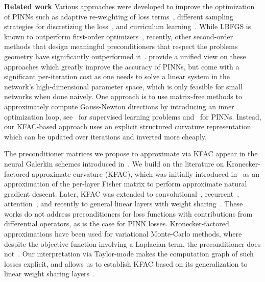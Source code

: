 \textbf{Related work}
Various approaches were developed to improve the optimization of PINNs such as adaptive re-weighting of loss terms~\citep{wang2021understanding,van2022optimally,wang2022and}, different sampling strategies for discretizing the loss~\citep{lu2021deepxde, nabian2021efficient, daw2022rethinking,zapf2022investigating, wang2022respecting, wu2023comprehensive}, and curriculum learning~\citep{krishnapriyan2021characterizing, wang2022respecting}.
While LBFGS is known to outperform first-order optimizers~\citep{markidis2021old},
recently, other second-order methods that design meaningful preconditioners that respect the problems geometry have significantly outperformed it~\cite{zeng2022competitive, muller2023achieving, de2023operator, liu2024preconditioning, jnini2024gauss,chen2024teng, zampini2024petscml}.
\citet{muller2024optimization} provide a unified view on these approaches which greatly improve the accuracy of PINNs, but come with a significant per-iteration cost as one needs to solve a linear system in the network's high-dimensional parameter space, which is only feasible for small networks when done naively.
One approach is to use matrix-free methods to approximately compute Gauss-Newton directions by introducing an inner optimization loop, see~\cite{schraudolph2002fast,martens2010deep} for supervised learning problems and~\cite{zeng2022competitive,bonfanti2024challenges, jnini2024gauss,zampini2024petscml} for PINNs.
Instead, our KFAC-based approach uses an explicit structured curvature representation which can be updated over iterations and inverted more cheaply.

The preconditioner matrices we propose to approximate via KFAC appear in the neural Galerkin schemes introduced in~\citet{bruna2024neural}.
We build on the literature on Kronecker-factored approximate curvature (KFAC), which was initially introduced in~\citet{heskes2000natural,martens2010deep} as an approximation of the per-layer Fisher matrix to perform approximate natural gradient descent.
Later, KFAC was extended to convolutional~\citep{grosse2016kroneckerfactored}, recurrent~\citep{martens2018kroneckerfactored}, attention~\citep{pauloski2021kaisa,osawa2023pipefisher,grosse2023studying}, and recently to general linear layers with weight sharing~\cite{eschenhagen2023kroneckerfactored}.
These works do not address preconditioners for loss functions with contributions from differential operators, as is the case for PINN losses.
Kronecker-factored approximations have been used for variational Monte-Carlo methods, where despite the objective function involving a Laplacian term, the preconditioner does not~\citep{pfau2020ab,drissi2024second}.
Our interpretation via Taylor-mode makes the computation graph of such losses explicit, and allows us to establish KFAC based on its generalization to linear weight sharing layers~\cite{eschenhagen2023kroneckerfactored}.

